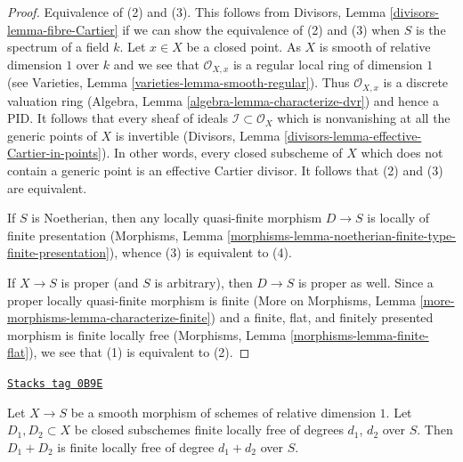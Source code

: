 \begin{proof}
Equivalence of (2) and (3). This follows from
Divisors, Lemma \ref{divisors-lemma-fibre-Cartier}
if we can show the equivalence of (2) and (3) when
$S$ is the spectrum of a field $k$. Let $x \in X$ be a closed point.
As $X$ is smooth of relative dimension $1$ over $k$ and we see that
$\mathcal{O}_{X, x}$ is a regular local ring of dimension $1$
(see Varieties, Lemma \ref{varieties-lemma-smooth-regular}).
Thus $\mathcal{O}_{X, x}$ is a discrete valuation ring
(Algebra, Lemma \ref{algebra-lemma-characterize-dvr})
and hence a PID. It follows that every sheaf of ideals
$\mathcal{I} \subset \mathcal{O}_X$ which is nonvanishing at all
the generic points of $X$ is invertible
(Divisors, Lemma \ref{divisors-lemma-effective-Cartier-in-points}).
In other words, every closed subscheme of $X$ which does not contain
a generic point is an effective Cartier divisor.
It follows that (2) and (3) are equivalent.

\medskip\noindent
If $S$ is Noetherian, then any locally quasi-finite morphism
$D \to S$ is locally of finite presentation (Morphisms, Lemma
\ref{morphisms-lemma-noetherian-finite-type-finite-presentation}),
whence (3) is equivalent to (4).

\medskip\noindent
If $X \to S$ is proper (and $S$ is arbitrary), then $D \to S$ is
proper as well. Since a proper locally quasi-finite morphism is finite
(More on Morphisms, Lemma \ref{more-morphisms-lemma-characterize-finite})
and a finite, flat, and finitely presented morphism is finite locally free
(Morphisms, Lemma \ref{morphisms-lemma-finite-flat}), we see that
(1) is equivalent to (2).
\end{proof}

\begin{lemma}
\label{pic-lemma-sum-divisors-on-curves}
\href{https://stacks.math.columbia.edu/tag/0B9E}{\texttt{Stacks tag 0B9E}}

Let $X \to S$ be a smooth morphism of schemes of relative dimension $1$.
Let $D_1, D_2 \subset X$ be closed subschemes finite locally free of
degrees $d_1$, $d_2$ over $S$. Then $D_1 + D_2$ is finite locally free
of degree $d_1 + d_2$ over $S$.
\end{lemma}

